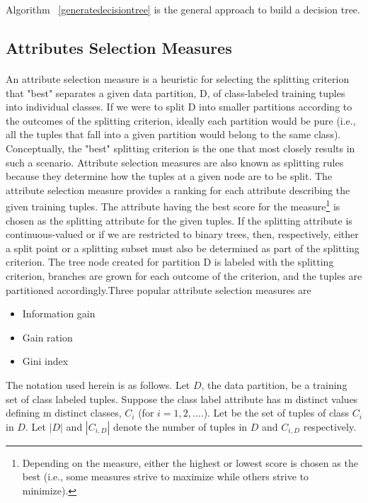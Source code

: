 Algorithm ~\ref{generatedecisiontree} is the general approach to build a decision tree.

\subsection{Attributes Selection Measures}
\paragraph{}
An attribute selection measure is a heuristic for selecting the splitting criterion that "best" separates a given
data partition, D, of class-labeled training tuples into individual classes. If we were to split D into smaller
partitions according to the outcomes of the splitting criterion, ideally each partition would be pure (i.e., all the
tuples that fall into a given partition would belong to the same class). Conceptually, the "best" splitting
criterion is the one that most closely results in such a scenario. Attribute selection measures are also known as
splitting rules because they determine how the tuples at a given node are to be split. \newline
The attribute selection measure provides a ranking for each attribute describing the given training tuples. The
attribute having the best score for the measure\footnote{\label{third}Depending on the measure, either the highest or lowest score is chosen as the best (i.e., some measures strive to maximize while others strive to minimize).} is chosen as the splitting attribute for the given tuples. If the
splitting attribute is continuous-valued or if we are restricted to binary trees, then, respectively, either a split
point or a splitting subset must also be determined as part of the splitting criterion. The tree node created for
partition D is labeled with the splitting criterion, branches are grown for each outcome of the criterion, and the
tuples are partitioned accordingly.Three popular attribute selection measures are

\begin{itemize}
\item Information gain
\item Gain ration
\item Gini index
\end{itemize}
The notation used herein is as follows. Let $D$, the data partition, be a training set of class labeled tuples.
Suppose the class label attribute has m distinct values defining m distinct classes, $C_i$ (for $i=1,2,....$). Let
be the set of tuples of class $C_i$ in $D$. Let $|D|$ and $|C_{i,D}|$ denote the number of tuples in $D$ and $C_{i,D}$
respectively.

